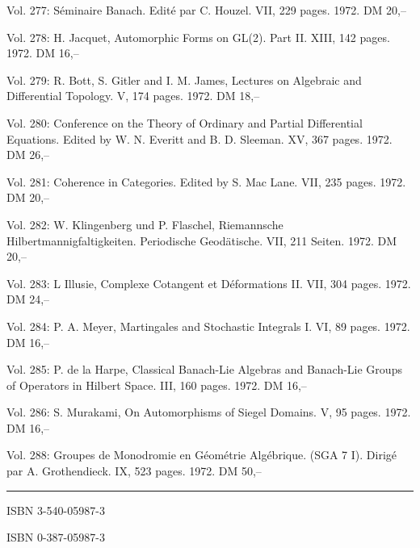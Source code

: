 Vol. 277: Séminaire Banach. Edité par C. Houzel. VII, 229 pages. 1972. DM 20,--

Vol. 278: H. Jacquet, Automorphic Forms on GL(2). Part II. XIII, 142 pages. 1972. DM 16,--

Vol. 279: R. Bott, S. Gitler and I. M. James, Lectures on Algebraic and Differential Topology. V, 174 pages. 1972. DM 18,--

Vol. 280: Conference on the Theory of Ordinary and Partial Differential Equations. Edited by W. N. Everitt and B. D. Sleeman. XV, 367 pages. 1972. DM 26,--

Vol. 281: Coherence in Categories. Edited by S. Mac Lane. VII, 235 pages. 1972. DM 20,--

Vol. 282: W. Klingenberg und P. Flaschel, Riemannsche Hilbertmannigfaltigkeiten. Periodische Geodätische. VII, 211 Seiten. 1972. DM 20,--

Vol. 283: L Illusie, Complexe Cotangent et Déformations II. VII, 304 pages. 1972. DM 24,--

Vol. 284: P. A. Meyer, Martingales and Stochastic Integrals I. VI, 89 pages. 1972. DM 16,--

Vol. 285: P. de la Harpe, Classical Banach-Lie Algebras and Banach-Lie Groups of Operators in Hilbert Space. III, 160 pages. 1972. DM 16,--

Vol. 286: S. Murakami, On Automorphisms of Siegel Domains. V, 95 pages. 1972. DM 16,--

Vol. 288: Groupes de Monodromie en Géométrie Algébrique. (SGA 7 I). Dirigé par A. Grothendieck. IX, 523 pages. 1972. DM 50,--

\noindent\rule{\linewidth}{0.4pt}



ISBN 3-540-05987-3

ISBN 0-387-05987-3
